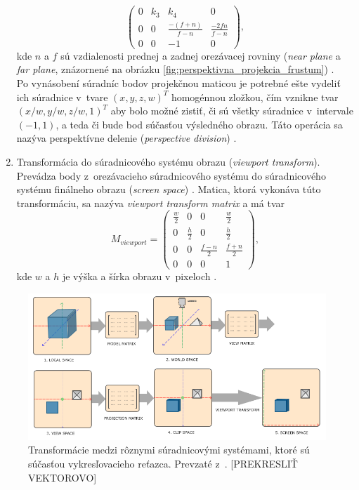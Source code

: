 \begin{enumerate}
$$\begin{pmatrix}
    0 & k_3 & k_4 & 0 \\
    0 & 0 & \frac{-(f+n)}{f-n} & \frac{-2fn}{f-n} \\
    0 & 0 & -1 & 0
    \end{pmatrix}
    \mathrm{,}
    $$
    kde $n$ a $f$ sú vzdialenosti prednej a zadnej orezávacej rovniny (\emph{near plane} a \emph{far plane}, znázornené na obrázku \ref{fig:perspektivna_projekcia_frustum}) \cite{ahn_projection_matrix}. \\ 
    Po vynásobení súradníc bodov projekčnou maticou je potrebné ešte vydeliť ich súradnice v~tvare $(x, y, z, w)^T$ homogénnou zložkou, čím vznikne tvar $(x/w, y/w, z/w, 1)^T$ aby bolo možné zistiť, či sú všetky súradnice v~intervale $(-1, 1)$, a teda či bude bod súčasťou výsledného obrazu. Táto operácia sa nazýva perspektívne delenie (\emph{perspective division}) \cite{de_vries_coordinate_systems}.  
    \item Transformácia do súradnicového systému obrazu (\emph{viewport transform}). Prevádza body z~orezávacieho súradnicového systému do súradnicového systému finálneho obrazu (\emph{\mbox{screen} space}) \cite{de_vries_coordinate_systems}. Matica, ktorá vykonáva túto transformáciu, sa nazýva \emph{viewport transform matrix} a má tvar
    $$
    M_{viewport} = 
    \begin{pmatrix}
    \frac{w}{2} & 0 & 0 & \frac{w}{2} \\
    0 & \frac{h}{2} & 0 & \frac{h}{2} \\
    0 & 0 & \frac{f-n}{2} & \frac{f+n}{2} \\
    0 & 0 & 0 & 1
    \end{pmatrix}
    \mathrm{,}
    $$
    kde $w$ a $h$ je výška a šírka obrazu v~pixeloch \cite{ahn_viewport_transform}.
\end{enumerate}

\begin{figure}[h]
    \centering
    \includegraphics[width=1\linewidth]{text_prace/obrazky-figures/suradnicove_systemy.png}
    \caption[Transformácie medzi rôznymi súradnicovými systémami, ktoré sú súčasťou vykresľovacieho reťazca.]{Transformácie medzi rôznymi súradnicovými systémami, ktoré sú súčasťou vykresľovacieho reťazca. Prevzaté z~\cite{de_vries_coordinate_systems}. [PREKRESLIŤ VEKTOROVO]}
    \label{fig:suradnicove_systemy}
\end{figure}

